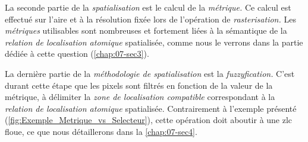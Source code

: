 La seconde partie de la \emph{spatialisation} est le calcul de la
\emph{métrique.} Ce calcul est effectué sur l'aire et à la résolution
fixée lors de l'opération de \emph{rasterisation.} Les
\emph{métriques} utilisables sont nombreuses et fortement liées à la
sémantique de la \emph{relation de localisation atomique} spatialisée,
comme nous le verrons dans la partie dédiée à cette question
(\autoref{chap:07-sec3}).

La dernière partie de la \emph{méthodologie de spatialisation} est la
\emph{fuzzyfication.} C'est durant cette étape que les pixels sont
filtrés en fonction de la valeur de la métrique, à délimiter la
\emph{zone de localisation compatible} correspondant à la
\emph{relation de localisation atomique} spatialisée. Contrairement à
l'exemple présenté (\autoref{fig:Exemple_Metrique_vs_Selecteur}),
cette opération doit aboutir à une \ac{zlc} floue, ce que nous
détaillerons dans la \autoref{chap:07-sec4}.


